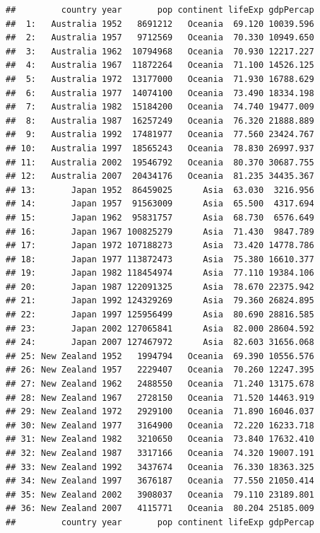 \documentclass[]{article}
\newenvironment{Shaded}{\begin{snugshade}}{\end{snugshade}}
\newcommand{\KeywordTok}[1]{\textcolor[rgb]{0.13,0.29,0.53}{\textbf{{#1}}}}
\newcommand{\StringTok}[1]{\textcolor[rgb]{0.31,0.60,0.02}{{#1}}}
\newcommand{\CommentTok}[1]{\textcolor[rgb]{0.56,0.35,0.01}{\textit{{#1}}}}
\newcommand{\NormalTok}[1]{{#1}}
\begin{document}
\begin{Shaded}
\end{Shaded}

\begin{verbatim}
##         country year       pop continent lifeExp gdpPercap
##  1:   Australia 1952   8691212   Oceania  69.120 10039.596
##  2:   Australia 1957   9712569   Oceania  70.330 10949.650
##  3:   Australia 1962  10794968   Oceania  70.930 12217.227
##  4:   Australia 1967  11872264   Oceania  71.100 14526.125
##  5:   Australia 1972  13177000   Oceania  71.930 16788.629
##  6:   Australia 1977  14074100   Oceania  73.490 18334.198
##  7:   Australia 1982  15184200   Oceania  74.740 19477.009
##  8:   Australia 1987  16257249   Oceania  76.320 21888.889
##  9:   Australia 1992  17481977   Oceania  77.560 23424.767
## 10:   Australia 1997  18565243   Oceania  78.830 26997.937
## 11:   Australia 2002  19546792   Oceania  80.370 30687.755
## 12:   Australia 2007  20434176   Oceania  81.235 34435.367
## 13:       Japan 1952  86459025      Asia  63.030  3216.956
## 14:       Japan 1957  91563009      Asia  65.500  4317.694
## 15:       Japan 1962  95831757      Asia  68.730  6576.649
## 16:       Japan 1967 100825279      Asia  71.430  9847.789
## 17:       Japan 1972 107188273      Asia  73.420 14778.786
## 18:       Japan 1977 113872473      Asia  75.380 16610.377
## 19:       Japan 1982 118454974      Asia  77.110 19384.106
## 20:       Japan 1987 122091325      Asia  78.670 22375.942
## 21:       Japan 1992 124329269      Asia  79.360 26824.895
## 22:       Japan 1997 125956499      Asia  80.690 28816.585
## 23:       Japan 2002 127065841      Asia  82.000 28604.592
## 24:       Japan 2007 127467972      Asia  82.603 31656.068
## 25: New Zealand 1952   1994794   Oceania  69.390 10556.576
## 26: New Zealand 1957   2229407   Oceania  70.260 12247.395
## 27: New Zealand 1962   2488550   Oceania  71.240 13175.678
## 28: New Zealand 1967   2728150   Oceania  71.520 14463.919
## 29: New Zealand 1972   2929100   Oceania  71.890 16046.037
## 30: New Zealand 1977   3164900   Oceania  72.220 16233.718
## 31: New Zealand 1982   3210650   Oceania  73.840 17632.410
## 32: New Zealand 1987   3317166   Oceania  74.320 19007.191
## 33: New Zealand 1992   3437674   Oceania  76.330 18363.325
## 34: New Zealand 1997   3676187   Oceania  77.550 21050.414
## 35: New Zealand 2002   3908037   Oceania  79.110 23189.801
## 36: New Zealand 2007   4115771   Oceania  80.204 25185.009
##         country year       pop continent lifeExp gdpPercap
\end{verbatim}
\end{document}
